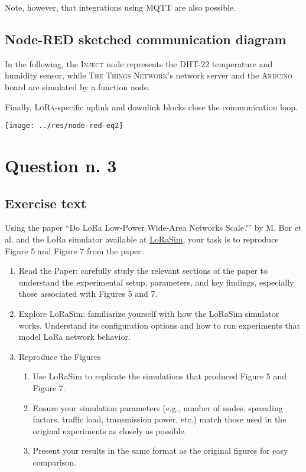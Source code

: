 \documentclass[a4paper,11pt]{article} %
\begin{document}
    \smallskip

    Note, however, that integrations using MQTT are also possible.

    \subsection{Node-RED sketched communication diagram}\label{subsec:node-red-sketched-communication-diagram}

    In the following, the \textsc{Inject} node represents the DHT-22 temperature and humidity sensor, while \textsc{The Things Network}'s network server and the \textsc{Arduino} board are simulated by a function node.

    \smallskip

    Finally, \textsc{LoRa}-specific uplink and downlink blocks close the communication loop.

    \medskip

    \texttt{[image: ../res/node-red-eq2]}


    \section{Question n. 3}\label{sec:question-n.-3}

    \subsection{Exercise text}\label{subsec:exercise-text3}

    Using the paper “Do LoRa Low-Power Wide-Area Networks Scale?” by M. Bor et al.
    and the LoRa simulator available at \href{https://www.lancaster.ac.uk/scc/sites/lora/lorasim.html}{LoRaSim}, your task is to reproduce Figure 5 and Figure 7 from the paper.

    \smallskip

    \begin{enumerate}
        \item Read the Paper: carefully study the relevant sections of the paper to understand the experimental setup, parameters, and key findings, especially those associated with Figures 5 and 7.
        \item Explore LoRaSim: familiarize yourself with how the LoRaSim simulator works.
        Understand its configuration options and how to run experiments that model LoRa network behavior.
        \item Reproduce the Figures
        \begin{enumerate}
            \item Use LoRaSim to replicate the simulations that produced Figure 5 and Figure 7.
            \item Ensure your simulation parameters (e.g., number of nodes, spreading factors, traffic load, transmission power, etc.) match those used in the original experiments as closely as possible.
            \item Present your results in the same format as the original figures for easy comparison.
        \end{enumerate}
    \end{enumerate}
\end{document}
